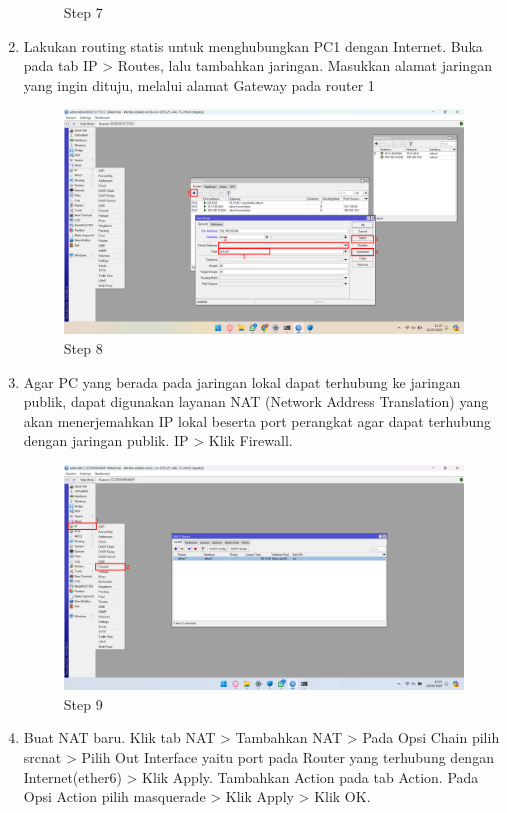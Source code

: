 \begin{center}
\begin{enumerate}
\begin{figure}[H]
			\caption{Step 7}
			\label{fig:Step 7(PC 1)}
		\end{figure}
        \item Lakukan routing statis untuk menghubungkan PC1 dengan Internet. Buka pada tab IP > Routes, lalu tambahkan jaringan. Masukkan alamat jaringan yang ingin dituju, melalui alamat Gateway pada router 1
        \begin{figure}[H]
			\centering
			\includegraphics[width=0.8\linewidth]{P4/img/pc1/Step 8.png}
			\caption{Step 8}
			\label{fig:Step 8(PC 1)}
		\end{figure}
		\item Agar PC yang berada pada jaringan lokal dapat terhubung ke jaringan publik, dapat digunakan layanan NAT (Network Address Translation) yang akan menerjemahkan IP lokal beserta port perangkat agar dapat terhubung dengan jaringan publik. IP > Klik Firewall.
        \begin{figure}[H]
			\centering
			\includegraphics[width=0.8\linewidth]{P4/img/pc1/Step 16.png}
			\caption{Step 9}
			\label{fig:Step 9(PC 1)}
		\end{figure}
		\item Buat NAT baru. Klik tab NAT > Tambahkan NAT > Pada Opsi Chain pilih srcnat > Pilih Out Interface yaitu port pada Router yang terhubung dengan Internet(ether6) > Klik Apply. Tambahkan Action pada tab Action. Pada Opsi Action pilih masquerade > Klik Apply > Klik OK.

\end{enumerate}
\end{center}
